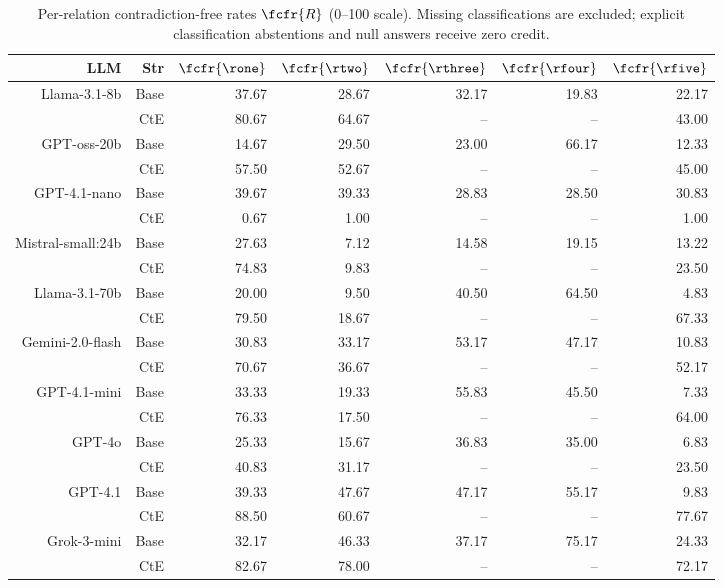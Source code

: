 \begin{table}[!t]
\caption{Per-relation contradiction-free rates $\fcfr{R}$ (0--100 scale). Missing classifications are excluded; explicit classification abstentions and null answers receive zero credit.}
\centering
{}

\footnotesize
\begin{tabular}{r r !{\color{white!80!black} \vline} r r r r r}
\toprule
\textbf{LLM} & \textbf{Str} & $\fcfr{\rone}$ & $\fcfr{\rtwo}$ & $\fcfr{\rthree}$ & $\fcfr{\rfour}$ & $\fcfr{\rfive}$ \\
\midrule
\sf Llama-3.1-8b  & Base & 37.67 & 28.67 & 32.17 & 19.83 & 22.17 \\
& CtE & 80.67 & 64.67 & -- & -- & 43.00 \\ \midrule
\sf GPT-oss-20b  & Base & 14.67 & 29.50 & 23.00 & 66.17 & 12.33 \\
& CtE & 57.50 & 52.67 & -- & -- & 45.00 \\ \midrule
\sf GPT-4.1-nano  & Base & 39.67 & 39.33 & 28.83 & 28.50 & 30.83 \\
& CtE & 0.67 & 1.00 & -- & -- & 1.00 \\ \midrule
\sf Mistral-small:24b  & Base & 27.63 & 7.12 & 14.58 & 19.15 & 13.22 \\
& CtE & 74.83 & 9.83 & -- & -- & 23.50 \\ \midrule
\sf Llama-3.1-70b  & Base & 20.00 & 9.50 & 40.50 & 64.50 & 4.83 \\
& CtE & 79.50 & 18.67 & -- & -- & 67.33 \\ \midrule
\sf Gemini-2.0-flash  & Base & 30.83 & 33.17 & 53.17 & 47.17 & 10.83 \\
& CtE & 70.67 & 36.67 & -- & -- & 52.17 \\ \midrule
\sf GPT-4.1-mini  & Base & 33.33 & 19.33 & 55.83 & 45.50 & 7.33 \\
& CtE & 76.33 & 17.50 & -- & -- & 64.00 \\ \midrule
\sf GPT-4o  & Base & 25.33 & 15.67 & 36.83 & 35.00 & 6.83 \\
& CtE & 40.83 & 31.17 & -- & -- & 23.50 \\ \midrule
\sf GPT-4.1  & Base & 39.33 & 47.67 & 47.17 & 55.17 & 9.83 \\
& CtE & 88.50 & 60.67 & -- & -- & 77.67 \\ \midrule
\sf Grok-3-mini  & Base & 32.17 & 46.33 & 37.17 & 75.17 & 24.33 \\
& CtE & 82.67 & 78.00 & -- & -- & 72.17 \\ \midrule

\end{tabular}
\end{table}
